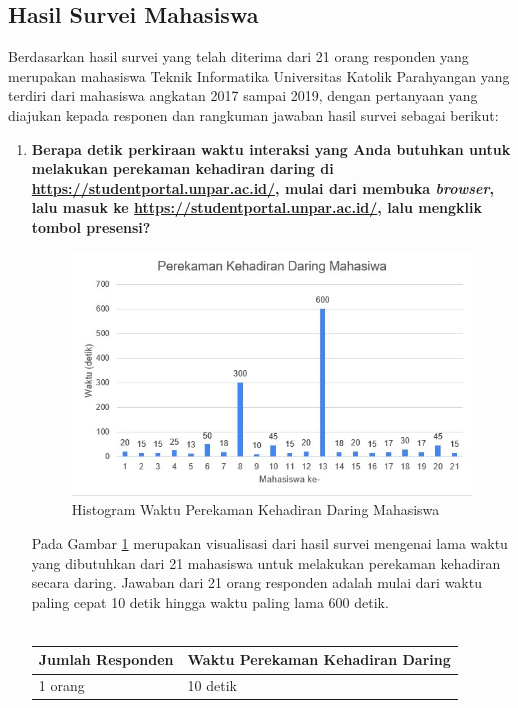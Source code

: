 \documentclass[a4paper,twoside]{article}
\begin{document}
\begin{enumerate}
		\subsection{Hasil Survei Mahasiswa}
		Berdasarkan hasil survei yang telah diterima dari 21 orang responden yang merupakan mahasiswa Teknik Informatika Universitas Katolik
		Parahyangan yang terdiri dari mahasiswa angkatan 2017 sampai 2019, dengan pertanyaan yang diajukan kepada responen dan rangkuman jawaban hasil survei sebagai berikut:
		\begin{enumerate}
			\item \textbf{Berapa detik perkiraan waktu interaksi yang Anda butuhkan untuk melakukan perekaman kehadiran daring di \url{https://studentportal.unpar.ac.id/}, mulai dari membuka \textit{browser}, lalu masuk ke \url{https://studentportal.unpar.ac.id/}, lalu mengklik tombol presensi?}
			\begin{figure}[H]
				\centering
				\includegraphics[scale=0.8]{Gambar/DaringMahasiswa.jpg}
				\caption{Histogram Waktu Perekaman Kehadiran Daring Mahasiswa} 
				\label{fig:DaringMahasiswa}
			\end{figure}
			Pada Gambar \ref{fig:DaringMahasiswa} merupakan visualisasi dari hasil survei mengenai lama waktu yang dibutuhkan dari 21 mahasiswa untuk melakukan perekaman kehadiran secara daring.
			Jawaban dari 21 orang responden adalah mulai dari waktu paling cepat 10 detik hingga waktu paling lama 600 detik.\\ \\
			\begin{tabular}{|p{4cm} |p{7cm}|}
				\hline
				Jumlah Responden &  Waktu Perekaman Kehadiran Daring \\ \hline     
				1 orang &  10 detik\\ \hline 

\end{tabular}
\end{enumerate}
\end{enumerate}
\end{document}
